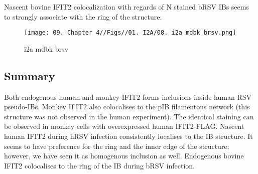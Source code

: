 Nascent bovine IFIT2 colocalization with regards of N stained bRSV IBs seems to strongly associate with the ring of the structure.

\begin{figure}
    \centering
    \texttt{[image: 09. Chapter 4//Figs//01. I2A/08. i2a mdbk brsv.png]}
    \caption[i2a mdbk brsv]{i2a mdbk brsv}
    \label{i2a mdbk brsv}
\end{figure}

\subsection{Summary} \label{Summary-i2a}
Both endogenous human and monkey IFIT2 forms inclusions inside human RSV pseudo-IBs. Monkey IFIT2 also colocalises to the pIB filamentous network (this structure was not observed in the human experiment). The identical staining can be observed in monkey cells with overexpressed human IFIT2-FLAG. Nascent human IFIT2 during hRSV infection consistently localises to the IB structure. It seems to have preference for the ring and the inner edge of the structure; however, we have seen it as homogenous inclusion as well. Endogenous bovine IFIT2 colocalises to the ring of the IB during bRSV infection.